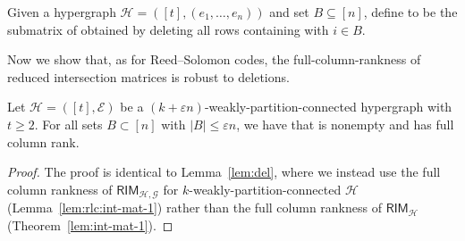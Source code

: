 \documentclass{article}[11pt]
\begin{document}
\begin{definition}
  Given a hypergraph $\mathcal{H}=([t],(e_1,\dots,e_n))$ and set $B \subseteq [n]$, define  to be the submatrix of  obtained by deleting all rows containing  with $i\in B$.
\end{definition}
Now we show that, as for Reed--Solomon codes, the full-column-rankness of reduced intersection matrices is robust to deletions.
\begin{lemma}
  Let $\mathcal{H}=([t],\mathcal{E})$ be a $(k+\varepsilon n)$-weakly-partition-connected hypergraph with $t \ge 2$.
  For all sets $B\subset[n]$ with $|B|\le \varepsilon n$, we have that  is nonempty and has full column rank. 
  \label{}
\end{lemma}
\begin{proof}
  The proof is identical to Lemma~\ref{lem:del}, where we instead use the full column rankness of $\mathsf{RIM}_{\mathcal{H},\mathcal{G}}$ for $k$-weakly-partition-connected $\mathcal{H}$ (Lemma~\ref{lem:rlc:int-mat-1}) rather than the full column rankness of $\mathsf{RIM}_{\mathcal{H}}$ (Theorem~\ref{lem:int-mat-1}).
\end{proof}
\end{document}

